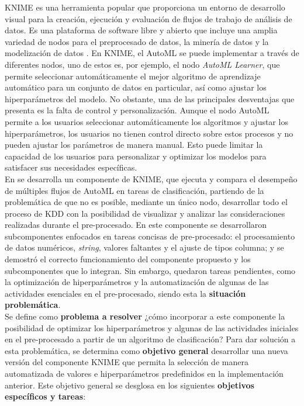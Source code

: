 KNIME es una herramienta popular que proporciona un entorno de desarrollo visual para la creación, ejecución y evaluación de flujos de trabajo de análisis de datos. Es una plataforma de software libre y abierto que incluye una amplia variedad de nodos para el preprocesado de datos, la minería de datos y la modelización de datos \citep{knime2023}. En KNIME, el AutoML se puede implementar a través de diferentes nodos, uno de estos es, por ejemplo, el nodo \textit{AutoML Learner}, que permite seleccionar automáticamente el mejor algoritmo de aprendizaje automático para un conjunto de datos en particular, así como ajustar los hiperparámetros del modelo. No obstante, una de las principales desventajas que presenta es la falta de control y personalización. Aunque el nodo AutoML permite a los usuarios seleccionar automáticamente los algoritmos y ajustar los hiperparámetros, los usuarios no tienen control directo sobre estos procesos y no pueden ajustar los parámetros de manera manual. Esto puede limitar la capacidad de los usuarios para personalizar y optimizar los modelos para satisfacer sus necesidades específicas. \\
En \citep{Carrazana2022} se desarrolla un componente de KNIME, que ejecuta y compara el desempeño de múltiples flujos de AutoML en tareas de clasificación, partiendo de la problemática de que no es posible, mediante un único nodo, desarrollar todo el proceso de KDD con la posibilidad de visualizar y analizar las consideraciones realizadas durante el pre-procesado. En este componente se desarrollaron subcomponentes enfocados en tareas concisas de pre-procesado: el procesamiento de datos numéricos, \textit{string}, valores faltantes y el ajuste de tipos columna; y se demostró el correcto funcionamiento del componente propuesto y los subcomponentes que lo integran. Sin embargo, quedaron tareas pendientes, como la optimización de hiperparámetros y la automatización de algunas de las actividades esenciales en el pre-procesado, siendo esta la \textbf{situación problemática}. \\
Se define como \textbf{problema a resolver} ¿cómo incorporar a este componente la posibilidad de optimizar los hiperparámetros y algunas de las actividades iniciales en el pre-procesado a partir de un algoritmo de clasificación? Para dar solución a esta problemática, se determina como \textbf{objetivo general} desarrollar una nueva versión del componente KNIME que permita la selección de manera automatizada de valores e hiperparámetros predefinidos en la implementación anterior. Este objetivo general se desglosa en los siguientes \textbf{objetivos específicos y tareas}:

